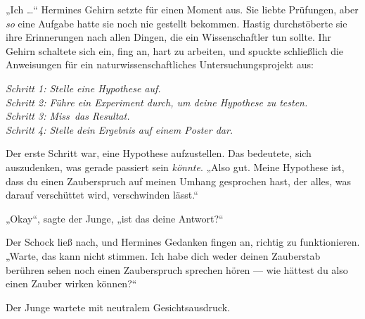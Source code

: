 „Ich …“ Hermines Gehirn setzte für einen Moment aus. Sie liebte Prüfungen, aber \emph{so} eine Aufgabe hatte sie noch nie gestellt bekommen. Hastig durchstöberte sie ihre Erinnerungen nach allen Dingen, die ein Wissenschaftler tun sollte. Ihr Gehirn schaltete sich ein, fing an, hart zu arbeiten, und spuckte schließlich die Anweisungen für ein naturwissenschaftliches Untersuchungsprojekt aus:

\emph{%
Schritt 1: Stelle eine Hypothese auf.\\
Schritt 2: Führe ein Experiment durch, um deine Hypothese zu testen.\\
Schritt 3: Miss~das Resultat.\\
Schritt 4: Stelle dein Ergebnis auf einem Poster dar.%
}

Der erste Schritt war, eine Hypothese aufzustellen. Das bedeutete, sich auszudenken, was gerade passiert sein \emph{könnte}.
„Also gut. Meine Hypothese ist, dass du einen Zauberspruch auf meinen Umhang gesprochen hast, der alles, was darauf verschüttet wird, verschwinden lässt.“

„Okay“, sagte der Junge, „ist das deine Antwort?“

Der Schock ließ nach, und Hermines Gedanken fingen an, richtig zu funktionieren.
„Warte, das kann nicht stimmen. Ich habe dich weder deinen Zauberstab berühren sehen noch einen Zauberspruch sprechen hören — wie hättest du also einen Zauber wirken können?“

Der Junge wartete mit neutralem Gesichtsausdruck.

